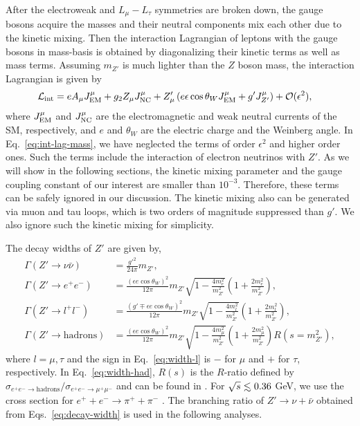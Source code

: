 \documentclass[preprint,amsmath,amssymb,superscriptaddress,nofootinbib]{revtex4}
\newcommand{\lsim}{\raise0.3ex\hbox{$\;<$\kern-0.75em\raise-1.1ex\hbox{$\sim\;$}}}
\begin{document}
After the electroweak and $L_\mu - L_\tau$ symmetries are broken down, the gauge bosons acquire the masses and 
their neutral components mix each other due to the kinetic mixing. 
Then the interaction Lagrangian of leptons with the gauge bosons in mass-basis is obtained by diagonalizing 
their kinetic terms as well as mass terms. 
Assuming $m_{Z'}$ is much lighter than the $Z$ boson mass, the interaction Lagrangian is 
given by
\begin{align}
\mathcal{L}_{\mathrm{int}} &=
e A_\mu J_{\rm EM}^\mu 
+g_2 Z_\mu J_{\rm NC}^\mu 
+ Z'_\mu \left(
  e \epsilon\cos\theta_W J_{\rm EM}^\mu
  +g' J_{Z'}^\mu
  \right)
  + \mathcal{O}(\epsilon^2), \label{eq:int-lag-mass}
\end{align}
where $J_{\rm EM}^\mu$ and $J_{\rm NC}^\mu$ are the electromagnetic and weak neutral currents of the SM, 
respectively, and $e$ and $\theta_W$ are the electric charge and the Weinberg angle. 
In Eq.~\eqref{eq:int-lag-mass}, we have neglected the terms of order $\epsilon^2$ and higher order ones. Such the terms 
include the interaction of electron neutrinos with $Z'$.
As we will show in the following sections, the kinetic mixing parameter and the gauge coupling constant of our interest 
are smaller than $10^{-3}$. Therefore, these terms can be safely ignored in our discussion. 
The kinetic mixing also can be generated via muon and tau loops, which is two orders of magnitude suppressed than $g'$. 
We also ignore such the kinetic mixing for simplicity. 

The decay widths of $Z'$ are given by,
\begin{subequations}
\begin{align}
\Gamma(Z' \rightarrow \nu \bar{\nu}) &= \frac{g'^2}{24 \pi} m_{Z'}, \\
%
\Gamma(Z' \rightarrow e^+ e^-) &= \frac{(\epsilon e \cos\theta_W)^2}{12 \pi} m_{Z'} 
   \sqrt{1 - \frac{4 m_e^2}{m_{Z'}^2}} \left( 1 + \frac{2 m_e^2}{m_{Z'}^2} \right), \\
%
\Gamma(Z' \rightarrow l^+ l^-) &= \frac{(g' \mp \epsilon e \cos\theta_W)^2}{12 \pi} m_{Z'} 
   \sqrt{1 - \frac{4 m_l^2}{m_{Z'}^2}} \left( 1 + \frac{2 m_l^2}{m_{Z'}^2} \right), \label{eq:width-l} \\
%
\Gamma(Z' \rightarrow \mathrm{hadrons}) &= \frac{(\epsilon  e \cos \theta_W)^2}{12 \pi} m_{Z'} 
   \sqrt{1 - \frac{4 m_\mu^2}{m_{Z'}^2}} \left( 1 + \frac{2 m_\mu^2}{m_{Z'}^2} \right) R(s = m_{Z'}^2),
   \label{eq:width-had}
%
\end{align} 
\label{eq:decay-width}
\end{subequations}
where $l = \mu,\tau$ and the sign in Eq.~\eqref{eq:width-l} is $-$ for $\mu$ and $+$ for $\tau$, respectively.
%
In Eq.~\eqref{eq:width-had},  $R(s)$ is the $R$-ratio defined by 
$\sigma_{e^+ e^- \rightarrow \mathrm{hadrons}}/\sigma_{e^+ e^- \rightarrow \mu^+ \mu^-}$ and can be found 
in \cite{Olive:2016xmw}. For $\sqrt{s} \lsim 0.36$ GeV, we use the cross section for $e^+ + e^- \rightarrow \pi^+ + \pi^-$ 
\cite{Ezhela:2003pp, Davier:2002dy}.
%
The branching ratio of $Z' \rightarrow \nu + \bar{\nu}$ obtained from Eqs.~\eqref{eq:decay-width} is used in the following 
analyses.
\end{document}
